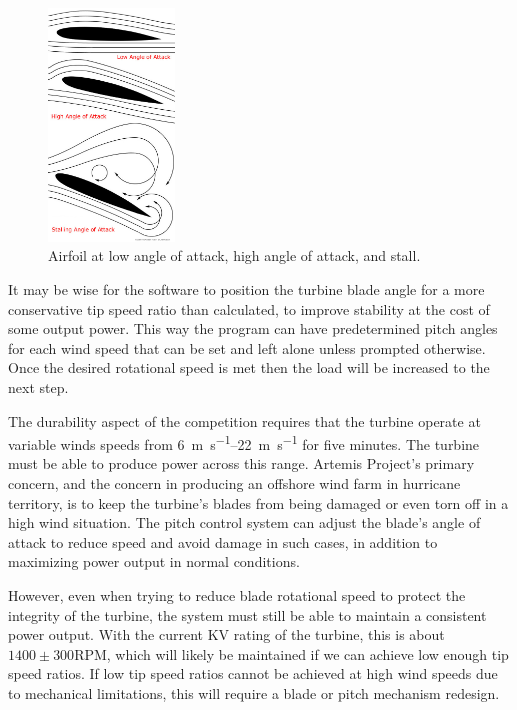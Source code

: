 \documentclass[11pt,letterpaper,conference]{IEEEtran}
\begin{document}
\begin{figure}[th]
    \centering
    \includegraphics[width=0.3\textwidth]{images/stall.jpg}
    \caption{Airfoil at low angle of attack, high angle of attack, and
        stall\cite{stall}.}
    \label{img:stall}
\end{figure}

It may be wise for the software to position the turbine blade angle for a
more conservative tip speed ratio than calculated, to improve stability at the
cost of some output power. This way the program can have predetermined pitch
angles for each wind speed that can be set and left alone unless prompted
otherwise. Once the desired rotational speed is met then the load will be
increased to the next step.

The durability aspect of the competition requires that the turbine operate at
variable winds speeds from \qtyrange{6}{22}{\m\per\s} for five minutes. The
turbine must be able to produce power across this range. Artemis Project's
primary concern, and the concern in producing an offshore wind farm in
hurricane territory, is to keep the turbine's blades from being damaged or
even torn off in a high wind situation. The pitch control system can adjust
the blade's angle of attack to reduce speed and avoid damage in such cases,
in addition to maximizing power output in normal conditions.

However, even when trying to reduce blade rotational speed to protect the
integrity of the turbine, the system must still be able to maintain a
consistent power output. With the current KV rating of the turbine, this is
about $1400 \pm 300$\;RPM, which will likely be maintained if we can achieve
low enough tip speed ratios. If low tip speed ratios cannot be achieved
at high wind speeds due to mechanical limitations, this will require a blade or
pitch mechanism redesign.
\end{document}
